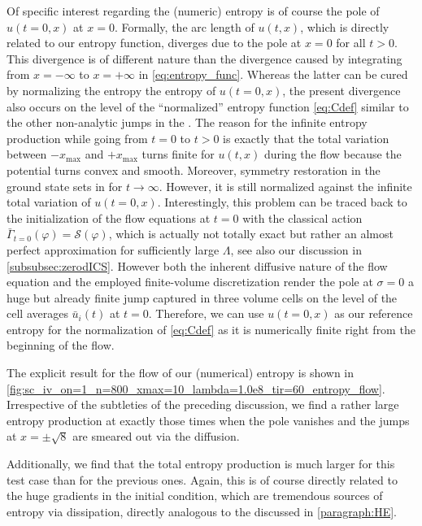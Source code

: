 Of specific interest regarding the (numeric) entropy is of course the pole of $u ( t = 0, x )$ at $x = 0$.
Formally, the arc length of $u ( t, x )$, which is directly related to our entropy function, diverges due to the pole at $x = 0$ for all $t > 0$.
This divergence is of different nature than the divergence caused by integrating from $x = - \infty$ to $x = + \infty$ in \cref{eq:entropy_func}.
Whereas the latter can be cured by normalizing the entropy \wrt{} the entropy of $u ( t = 0, x)$, the present divergence also occurs on the level of the ``normalized''  entropy function \eqref{eq:Cdef} similar to the other non-analytic jumps in the \uv{}.
The reason for the infinite entropy production while going from $t = 0$ to $t > 0$ is exactly that the total variation between $- x_{\mathrm{max}}$ and $+ x_{\mathrm{max}}$ turns finite for $u ( t, x )$ during the flow because the potential turns convex and smooth.
Moreover, symmetry restoration in the ground state sets in for $t \rightarrow \infty$.
However, it is still normalized against the infinite total variation of $u ( t = 0, x )$.
Interestingly, this problem can be traced back to the initialization of the \frg{} flow equations at $t = 0$ with the classical \uv{} action $\bar{\Gamma}_{t = 0} ( \varphi ) = \mathcal{S} ( \varphi )$, which is actually not totally exact but rather an almost perfect approximation for sufficiently large $\Lambda$, see also our discussion in \cref{subsubsec:zerodICS}.
However both the inherent diffusive nature of the \frg{} flow equation and the employed finite-volume discretization render the pole at $\sigma = 0$ a huge but already finite jump captured in three volume cells on the level of the cell averages $\bar{u}_i ( t )$ at $t = 0$.
Therefore, we can use $u ( t = 0, x )$ as our reference entropy for the normalization of \cref{eq:Cdef} as it is numerically finite right from the beginning of the flow.\bigskip

The explicit result for the \frg{} flow of our (numerical) entropy is shown in \cref{fig:sc_iv_on=1_n=800_xmax=10_lambda=1.0e8_tir=60_entropy_flow}.
Irrespective of the subtleties of the preceding discussion, we find a rather large entropy production at exactly those times when the pole vanishes and the jumps at $x = \pm \sqrt{8}$ are smeared out via the diffusion.

Additionally, we find that the total entropy production is much larger for this test case than for the previous ones. Again, this is of course directly related to the huge gradients in the initial condition, which are tremendous sources of entropy via dissipation, directly analogous to the \he{} discussed in \cref{paragraph:HE}.\bigskip

